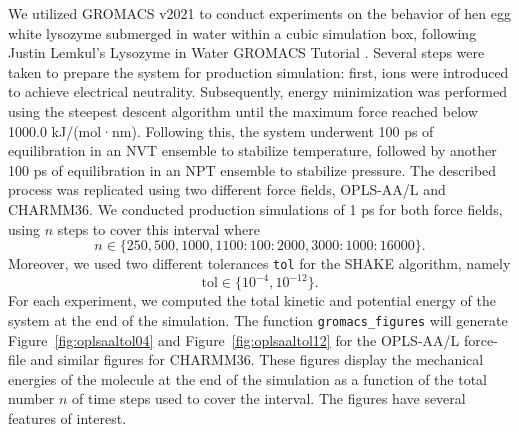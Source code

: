 \documentclass[runningheads]{llncs}
\begin{document}
We utilized GROMACS v2021 to conduct experiments on the behavior of hen egg white lysozyme submerged in water within a cubic simulation box, following Justin Lemkul's Lysozyme in Water GROMACS Tutorial \cite{}. Several steps were taken to prepare the system for production simulation: first, ions were introduced to achieve electrical neutrality. Subsequently, energy minimization was performed using the steepest descent algorithm until the maximum force reached below 1000.0 kJ/(mol·nm). Following this, the system underwent 100 ps of equilibration in an NVT ensemble to stabilize temperature, followed by another 100 ps of equilibration in an NPT ensemble to stabilize pressure. The described process was replicated using two different force fields, OPLS-AA/L and CHARMM36. We conducted production simulations of 1 ps for both force fields, using $n$ steps to cover this interval where
\begin{equation}
  n \in \{250, 500, 1000, 1100:100:2000, 3000:1000:16000\}.
\end{equation}
Moreover, we used two different tolerances {\tt tol} for the SHAKE algorithm, namely
\begin{equation}
  \text{tol} \in \{10^{-4}, 10^{-12}\}.
\end{equation}
For each experiment, we computed the total kinetic and potential energy of the system at the end of the simulation.
The function {\tt gromacs\_figures} will generate Figure~\ref{fig:oplsaaltol04} and Figure~\ref{fig:oplsaaltol12} for the OPLS-AA/L force-file and similar figures for CHARMM36. These figures display the mechanical energies of the molecule at the end of the simulation as a function of the total number $n$ of time steps used to cover the interval. The figures have several features of interest.
\end{document}
